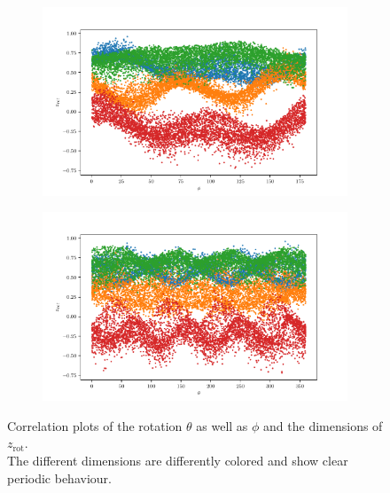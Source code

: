 \documentclass[10pt,a4paper]{article}
\newcommand{\rot}{\ensuremath{\text{rot}\xspace}}
\begin{document}
\begin{figure}[!ht]
    \centering
    \begin{subfigure}{0.49\textwidth}
        \centering
        \includegraphics[width=\textwidth] {cube_rot_phi_z_all.pdf}
        \caption{}
        \label{fig_rotph_all}
    \end{subfigure}
    \begin{subfigure}{0.49\textwidth}
        \centering	
        \includegraphics[width=\textwidth]{cube_rot_theta_z_all.pdf}
        \caption{}
        \label{fig_rotth_all}
    \end{subfigure}
    \caption{Correlation plots of the rotation $\theta$ as well as $\phi$ and the dimensions of $z_{\rot}$.\\
    The different dimensions are differently colored and show clear periodic behaviour.} \label{cube_corr_rot}
\end{figure}


\newpage
\end{document}
